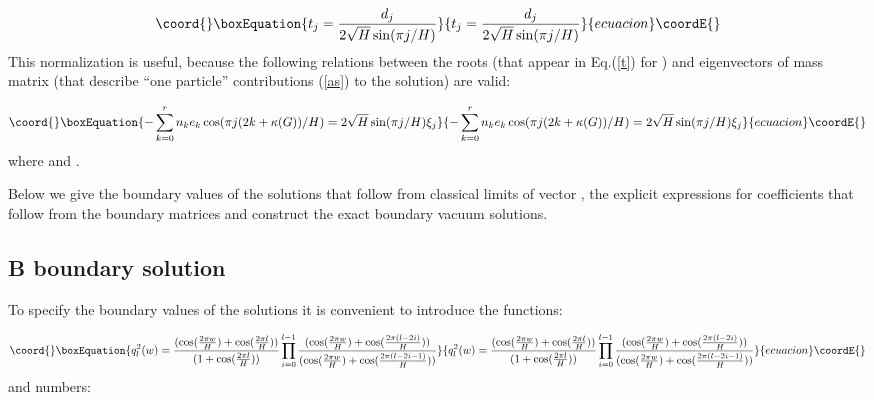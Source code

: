 \documentclass[a4paper,12pt,titlepage,final]{article}
\begin{document}
\begin{equation}\coord{}\boxEquation{
t_{j}=\frac{d_{j}}{2\sqrt{H}\sin (\pi j/H)}  \label{tj}
}{
t_{j}=\frac{d_{j}}{2\sqrt{H}\sin (\pi j/H)}  }{ecuacion}\coordE{}\end{equation}
This normalization is useful, because
the following relations between the roots \coordHE{} (that appear
in Eq.(\ref{t}) for \coordHE{}) and eigenvectors of mass
matrix \coordHE{} (that describe
 ``one particle'' contributions (\ref{as}) to the solution) are valid:

\begin{equation}\coord{}\boxEquation{
-\sum_{k=0}^{r}n_{k}e_{k}\cos (\pi j(2k+\kappa (G))/H)=2\sqrt{H}\sin (\pi
j/H)\xi _{j}  \label{eks}
}{
-\sum_{k=0}^{r}n_{k}e_{k}\cos (\pi j(2k+\kappa (G))/H)=2\sqrt{H}\sin (\pi
j/H)\xi _{j}  }{ecuacion}\coordE{}\end{equation}
where \coordHE{}  \coordHE{} and \coordHE{}.

Below we give the boundary values of the solutions that follow from
classical limits of vector \coordHE{}, the explicit expressions for
coefficients \coordHE{} that follow from the boundary \coordHE{}matrices and
construct the exact boundary vacuum solutions.

\subsection{B\coordHE{} boundary solution}

To specify the boundary values of the solutions it is convenient to
introduce the functions:

\begin{equation}\coord{}\boxEquation{
q_{l}^{2}(w)=\frac{(\cos (\frac{2\pi w}{H})+\cos (\frac{2\pi l}{H}))}
{(1+\cos (\frac{2\pi l}{H}))}
\prod_{i=0}^{l-1}\frac{(\cos (\frac{2\pi w}{H})+
\cos (\frac{2\pi (l-2i)}{H}))}{(\cos (\frac{2\pi w}{H})+\cos (\frac{2\pi
(l-2i-1)}{H}))}  \label{h}
}{
q_{l}^{2}(w)=\frac{(\cos (\frac{2\pi w}{H})+\cos (\frac{2\pi l}{H}))}
{(1+\cos (\frac{2\pi l}{H}))}
\prod_{i=0}^{l-1}\frac{(\cos (\frac{2\pi w}{H})+
\cos (\frac{2\pi (l-2i)}{H}))}{(\cos (\frac{2\pi w}{H})+\cos (\frac{2\pi
(l-2i-1)}{H}))}  }{ecuacion}\coordE{}\end{equation}
and numbers:
\end{document}
